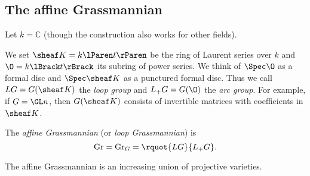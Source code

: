 \documentclass[english, no-theorem-numbers]{short-notes}
\begin{document}
\subsection{The affine Grassmannian}

Let $k = ℂ$ (though the construction also works for other fields).

We set $\K = k\lParen t \rParen$ be the ring of Laurent series over $k$ and $\O = k\lBrack t \rBrack$ its subring of power series.
We think of $\Spec \O$ as a formal disc and $\Spec \K$ as a punctured formal disc.
Thus we call $LG = G(\K)$ the \emph{loop group} and $L_+G = G(\O)$ the \emph{arc group}.
For example, if $G = \GL n$, then $G(\K)$ consists of invertible matrices with coefficients in $\K$.

\begin{Def}
    The \emph{affine Grassmannian} (or \emph{loop Grassmannian}) is
    \[
        \Gr = \Gr_G = \rquot{LG}{L_+G}.
    \]
\end{Def}

The affine Grassmannian is an increasing union of projective varieties.
\end{document}

